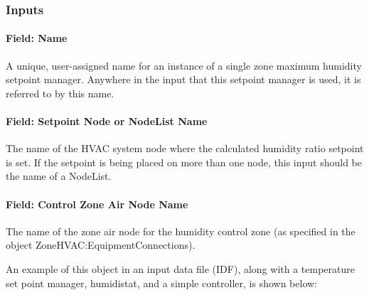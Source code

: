 \subsubsection{Inputs}\label{inputs-7-024}

\paragraph{Field: Name}\label{field-name-7-019}

A unique, user-assigned name for an instance of a single zone maximum humidity setpoint manager. Anywhere in the input that this setpoint manager is used, it is referred to by this name.

\paragraph{Field: Setpoint Node or NodeList Name}\label{field-setpoint-node-or-nodelist-name-7}

The name of the HVAC system node where the calculated humidity ratio setpoint is set. If the setpoint is being placed on more than one node, this input should be the name of a NodeList.

\paragraph{Field: Control Zone Air Node Name}\label{field-control-zone-air-node-name-1}

The name of the zone air node for the humidity control zone (as specified in the object ZoneHVAC:EquipmentConnections).

An example of this object in an input data file (IDF), along with a temperature set point manager, humidistat, and a simple controller, is shown below:


